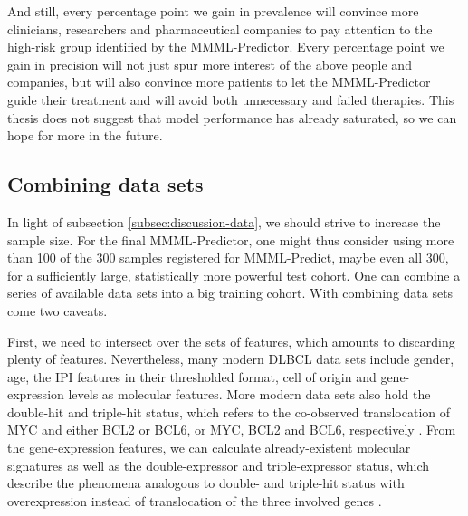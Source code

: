 And still, every percentage point we gain in prevalence will convince more clinicians, researchers 
and pharmaceutical companies to pay attention to the high-risk group identified by the MMML-Predictor.
Every percentage point we gain in precision will not just spur more interest of the above people and 
companies, but will also convince more patients to let the MMML-Predictor guide their treatment and 
will avoid both unnecessary and failed therapies. This thesis does not suggest that model performance 
has already saturated, so we can hope for more in the future.

\subsection{Combining data sets}

In light of subsection \ref{subsec:discussion-data}, we should strive to increase the sample size.
For the final MMML-Predictor, one might thus consider using more than \num{100} of the \num{300} 
samples registered for MMML-Predict, maybe even all \num{300}, for a sufficiently large, 
statistically more powerful test cohort. One can combine a series of available data sets into a 
big training cohort. With combining data sets come two caveats. 

First, we need to intersect over the sets of features, which amounts to discarding plenty 
of features. Nevertheless, many modern DLBCL data sets include gender, age, the IPI features in 
their thresholded format, cell of origin and gene-expression levels as molecular features. More 
modern data sets also hold the double-hit and triple-hit status, which refers to the co-observed 
translocation of MYC and either BCL2 or BCL6, or MYC, BCL2 and BCL6, respectively \cite{aukema11}. 
From the gene-expression features, we can calculate already-existent molecular signatures as well 
as the double-expressor and triple-expressor status, which describe the phenomena analogous to 
double- and triple-hit status with overexpression instead of translocation of the three involved 
genes \cite{horn13}.


